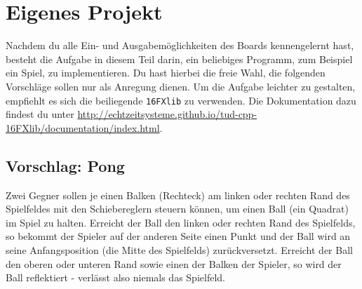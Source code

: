 \section{Eigenes Projekt}
Nachdem du alle Ein- und Ausgabemöglichkeiten des Boards kennengelernt hast, besteht die Aufgabe in diesem Teil darin, ein beliebiges Programm, zum Beispiel ein Spiel, zu implementieren.
Du hast hierbei die freie Wahl, die folgenden Vorschläge sollen nur als Anregung dienen.
Um die Aufgabe leichter zu gestalten, empfiehlt es sich die beiliegende \lstinline{16FXlib} zu verwenden.
Die Dokumentation dazu findest du unter \url{http://echtzeitsysteme.github.io/tud-cpp-16FXlib/documentation/index.html}.

\subsection*{Vorschlag: Pong}
Zwei Gegner sollen je einen Balken (Rechteck) am linken oder rechten Rand des Spielfeldes mit den Schiebereglern steuern können, um einen Ball (ein Quadrat) im Spiel zu halten.
Erreicht der Ball den linken oder rechten Rand des Spielfelds, so bekommt der Spieler auf der anderen Seite einen Punkt und der Ball wird an seine Anfangsposition (die Mitte des Spielfelds) zurückversetzt.
Erreicht der Ball den oberen oder unteren Rand sowie einen der Balken der Spieler, so wird der Ball reflektiert - verlässt also niemals das Spielfeld.

